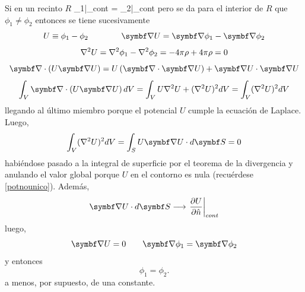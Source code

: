 \documentclass[10pt,oneside]{CBFT_book}
\begin{document}
Si en un recinto $R$
\be
	\phi_1|_{cont} = \phi_2|_{cont}
	\label{potnounico}
\ee
pero se da para el interior de $R$ que $\phi_1\neq\phi_2$ entonces se tiene sucesivamente
\[
	U \equiv \phi_1 - \phi_2 \qquad \qquad \Nabla U = \Nabla \phi_1 - \Nabla \phi_2
\]
\[
	\nabla^2{U} = \nabla^2{\phi_1} - \nabla^2{\phi_2} = -4\pi \rho + 4\pi\rho = 0
\]
\[
	\Nabla\cdot\left( U\Nabla U \right) = U\left( \Nabla\cdot\Nabla U \right) + \Nabla U \cdot \Nabla U
\]
\[
	\int_V \Nabla\cdot\left( U\Nabla U \right) dV = 
	\int_V U \lapm{U}  + (\lapm{U})^2 dV =  \int_V (\lapm{U})^2 dV
\]
llegando al último miembro porque el potencial $U$ cumple la ecuación de Laplace. Luego,
\[
	\int_V (\lapm{U})^2 dV = \int_S U\Nabla{U} \cdot d\vb{S} = 0
\]
habiéndose pasado a la integral de superficie por el teorema de la divergencia y anulando 
el valor global porque 
$U$ en el contorno es nula (recuérdese \eqref{potnounico}). Además, 
\[
	\Nabla{U} \cdot d\vb{S}  \longrightarrow \left.\dpar{U}{\hat{n}}\right|_{cont}
\]
luego,
\[
	\Nabla U = 0 \qquad \Nabla\phi_1 = \Nabla\phi_2 
\]
y entonces
\[
	\phi_1 = \phi_2 .
\]
a menos, por supuesto, de una constante.


\end{document}
